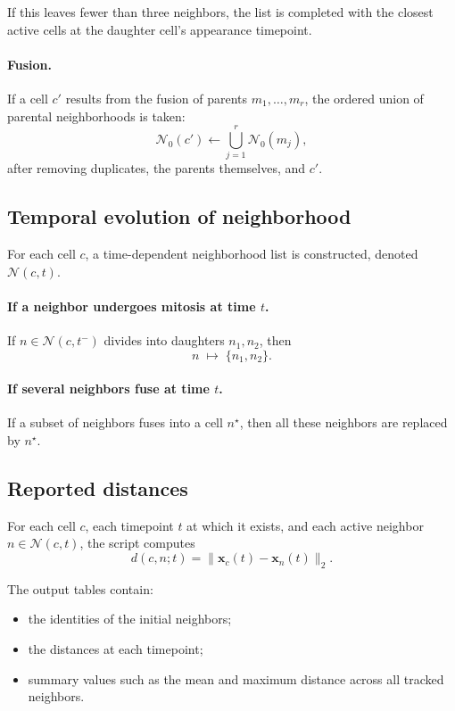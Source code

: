 \documentclass[11pt,a4paper]{article}
\begin{document}
If this leaves fewer than three neighbors, the list is completed with the closest active cells at the daughter cell's appearance timepoint.

\paragraph{Fusion.}
If a cell $c'$ results from the fusion of parents $m_1,\dots,m_r$, the ordered union of parental neighborhoods is taken:
\[
\mathcal{N}_0(c') \leftarrow
\bigcup_{j=1}^{r} \mathcal{N}_0(m_j),
\]
after removing duplicates, the parents themselves, and $c'$.

\subsection{Temporal evolution of neighborhood}

For each cell $c$, a time-dependent neighborhood list is constructed, denoted $\mathcal{N}(c,t)$.

\paragraph{If a neighbor undergoes mitosis at time $t$.}
If $n\in \mathcal{N}(c,t^-)$ divides into daughters $n_1,n_2$, then
\[
n \;\mapsto\; \{n_1,n_2\}.
\]

\paragraph{If several neighbors fuse at time $t$.}
If a subset of neighbors fuses into a cell $n^\star$, then all these neighbors are replaced by $n^\star$.

\subsection{Reported distances}

For each cell $c$, each timepoint $t$ at which it exists, and each active neighbor $n\in\mathcal{N}(c,t)$, the script computes
\[
d(c,n;t)=\|\mathbf{x}_c(t)-\mathbf{x}_n(t)\|_2.
\]

The output tables contain:
\begin{itemize}
  \item the identities of the initial neighbors;
  \item the distances at each timepoint;
  \item summary values such as the mean and maximum distance across all tracked neighbors.
\end{itemize}
\end{document}
